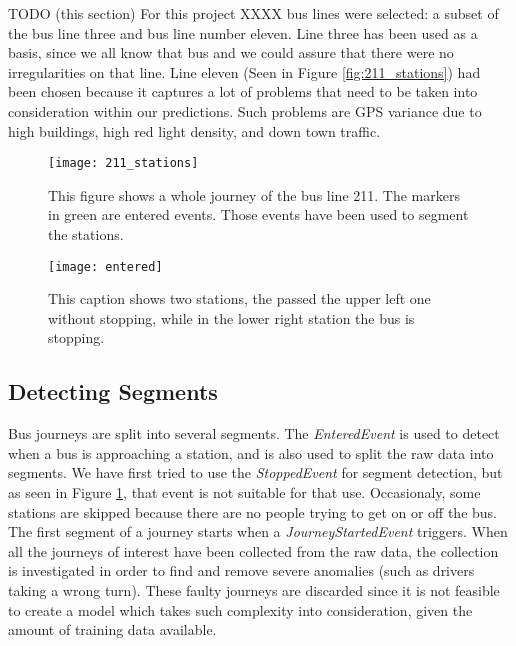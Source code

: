 TODO (this section) For this project XXXX bus lines were selected: a subset of the bus line three and bus line number eleven. Line three has been used as a basis, since we all know that bus and we could assure that there were no irregularities on that line. Line eleven (Seen in Figure \ref{fig:211_stations}) had been chosen because it captures a lot of problems that need to be taken into consideration within our predictions. Such problems are GPS variance due to high buildings, high red light density, and down town traffic. 

\begin{figure}[t!]
\begin{minipage}{.5\textwidth}
	\texttt{[image: 211\_stations]}
	\caption{This figure shows a whole journey of the bus line 211. The markers in green are entered events. Those events have been used to segment the stations.}
	\label{fig:211_stations}
\end{minipage}
\hspace{5pt}
\begin{minipage}{.48\textwidth}
\texttt{[image: entered]}
\caption{This caption shows two stations,  the passed the upper left one without stopping, while in the lower right station the bus is stopping.}
\label{fig:entered}
\end{minipage}
\end{figure}


\subsection{Detecting Segments}
Bus journeys are split into several segments. The \textit{EnteredEvent} is used to detect when a bus is approaching a station, and is also used to split the raw data into segments.  We have first tried to use the \textit{StoppedEvent} for segment detection, but as seen in Figure \ref{fig:entered}, that event is not suitable for that use. Occasionaly, some stations are skipped because there are no people trying to get on or off the bus.
The first segment of a journey starts when a \textit{JourneyStartedEvent} triggers. When all the journeys of interest have been collected from the raw data, the collection is investigated in order to find and remove severe anomalies (such as drivers taking a wrong turn). These faulty journeys are discarded since it is not feasible to create a model which takes such complexity into consideration, given the amount of training data available.

